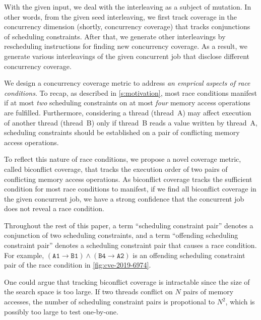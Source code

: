 With the given input, we deal with the interleaving as a subject of
mutation. In other words, from the given seed interleaving, we first
track coverage in the concurrency dimension (shortly, concurrency
coverage) that tracks conjunctions of scheduling constraints. After
that, we generate other interleavings by rescheduling instructions for
finding new concurrency coverage.
%
As a result, we generate various interleavings of the given concurrent
job that disclose different concurrency coverage.
%
%

%
We design a concurrency coverage metric to address \textit{an emprical
  aspects of race conditions}.
%
To recap, as described in \autoref{s:motivation}, most race conditions
manifest if at most \textit{two} scheduling constraints on at most
\textit{four} memory access operations are fulfilled.
%
Furthermore, considering a thread (thread~A) may affect execution of
another thread (thread~B) only if thread~B reads a value written by
thread~A, scheduling constraints should be established on a pair of
conflicting memory access operations.

To reflect this nature of race conditions, we propose a novel coverage
metric, called biconflict coverage, that tracks the execution order of
two pairs of conflicting memory access operations.
%
As biconflict coverage tracks the sufficient condition for most race
conditions to manifest, if we find all biconflict coverage in the
given concurrent job, we have a strong confidence that the concurrent
job does not reveal a race condition.

Throughout the rest of this paper, a term ``scheduling constraint
pair'' denotes a conjunction of two scheduling constraints, and a term
``offending scheduling constraint pair'' denotes a scheduling
constraint pair that causes a race condition.  For example,
$(\texttt{A1} \rightarrow \texttt{B1}) \wedge (\texttt{B4} \rightarrow
\texttt{A2})$ is an offending scheduling constraint pair of the race
condition in \autoref{fig:cve-2019-6974}.

%
%
One could argue that tracking biconflict coverage is intractable since
the size of the search space is too large.
%
If two threads conflict on $N$ pairs of memory accesses, the number of
scheduling constraint pairs is propotional to $N^2$, which is possibly
too large to test one-by-one.


